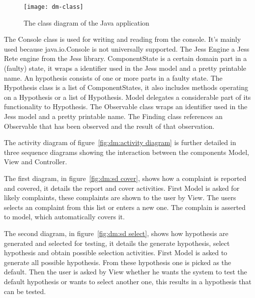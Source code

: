 \begin{figure}[htbp]
    \centering
    \texttt{[image: dm-class]}
    \caption{The class diagram of the Java application}
    \label{fig:dm:class diagram}
\end{figure}

The Console class is used for writing and reading from the console. It's mainly
used because java.io.Console is not universally supported. The Jess Engine a Jess
Rete engine from the Jess library. ComponentState is a certain domain part in a
(faulty) state, it wraps a identifier used in the Jess model and a pretty
printable name. An hypothesis consists of one or more parts in a faulty state.
The Hypothesis class  is a list of ComponentStates, it also includes methods operating on
a Hypothesis or a list of Hypothesis. Model delegates a considerable part of its
functionality to Hypothesis. The Observable class wraps an identifier used in the Jess model and a pretty
printable name. The Finding class references an Observable that has been
observed and the result of that observation.

The activity diagram of figure~\ref{fig:dm:activity diagram} is further detailed
in three sequence diagrams showing the interaction between the components Model, View and
Controller.

The first diagram, in figure~\ref{fig:dm:sd cover}, shows how a complaint is
reported and covered, it details the report and cover activities. First Model
is asked for likely complaints, these complaints are shown to the user by View.
The users selects an complaint from this list or enters a new one. The complain
is asserted to model, which automatically covers it.

The second diagram, in figure~\ref{fig:dm:sd select}, shows how hypothesis are generated
and selected for testing, it details the generate hypothesis, select hypothesis
and obtain possible selection activities. First Model is asked to generate all
possible hypothesis. From these hypothesis one is picked as the default. Then
the user is asked by View whether he wants the system to test the default
hypothesis or wants to select another one, this results in a hypothesis that can
be tested.

